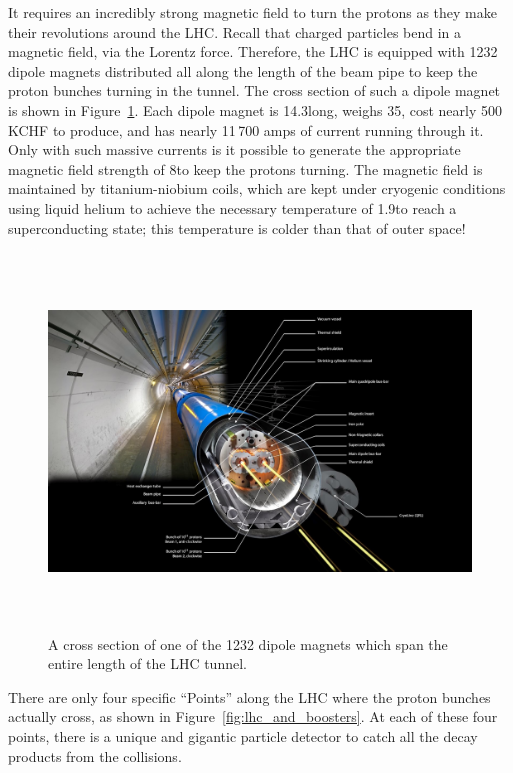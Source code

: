 It requires an incredibly strong magnetic field to turn the protons as they make their revolutions around the LHC. 
Recall that charged particles bend in a magnetic field, via the Lorentz force. 
Therefore, the LHC is equipped with 1232 dipole magnets distributed all along the length of the beam pipe to keep the proton bunches turning in the tunnel.
The cross section of such a dipole magnet is shown in Figure~\ref{fig:lhc_dipole_xs}.
Each dipole magnet is 14.3\meter long, weighs 35\tonne, cost nearly 500\,KCHF to produce, and has nearly 11\,700 amps of current running through it. 
Only with such massive currents is it possible to generate the appropriate magnetic field strength of 8\tesla to keep the protons turning. 
The magnetic field is maintained by titanium-niobium coils, which are kept under cryogenic conditions using liquid helium to achieve the necessary temperature of 1.9\kelvin to reach a superconducting state; 
this temperature is colder than that of outer space!
\begin{figure}[pbth]
\centering
\includegraphics[width=15cm,height=10cm,keepaspectratio]{figures/lhc/lhc_dipole_xs.jpg}
    \caption{
    A cross section of one of the 1232 dipole magnets which span the entire length of the LHC tunnel.} 
    \label{fig:lhc_dipole_xs}
\end{figure}

There are only four specific ``Points'' along the LHC where the proton bunches actually cross, as shown in Figure~\ref{fig:lhc_and_boosters}.
At each of these four points, there is a unique and gigantic particle detector to catch all the decay products from the \pp collisions. 


